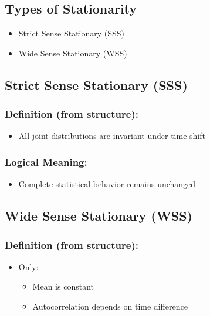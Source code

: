 \documentclass[12pt]{article}
\begin{document}
\subsection{Types of Stationarity}

\begin{itemize}
    \item Strict Sense Stationary (SSS)
    \item Wide Sense Stationary (WSS)
\end{itemize}

\subsection{Strict Sense Stationary (SSS)}

\subsubsection*{Definition (from structure):}

\begin{itemize}
    \item All joint distributions are invariant under time shift
\end{itemize}

\subsubsection*{Logical Meaning:}

\begin{itemize}
    \item Complete statistical behavior remains unchanged
\end{itemize}

\subsection{Wide Sense Stationary (WSS)}

\subsubsection*{Definition (from structure):}

\begin{itemize}
    \item Only:
    \begin{itemize}
        \item Mean is constant
        \item Autocorrelation depends on time difference
    \end{itemize}
\end{itemize}
\end{document}
